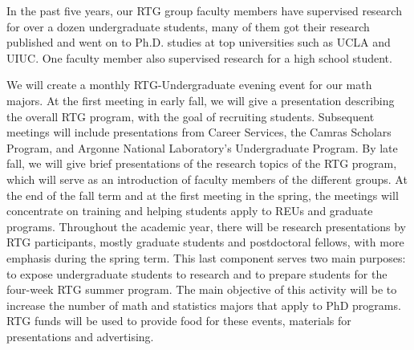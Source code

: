 \documentclass[11pt]{NSFamsart}
\begin{document}
In the past five years, our RTG group faculty members have
supervised research for over a dozen undergraduate students, many of them got their research published and went on to Ph.D. studies at top universities such as    UCLA and UIUC.   One faculty member also supervised research for a high school student.  




We will create a monthly RTG-Undergraduate evening event for our   math majors. At the first meeting in early fall,
we will give a presentation describing the overall RTG program, with the goal of recruiting students.
Subsequent meetings will include presentations from   Career  Services, the Camras Scholars
Program, and    Argonne National Laboratory's Undergraduate Program. By late fall, we will give brief presentations of the
research topics of the RTG program, which will serve as an introduction of faculty members of the different
groups. At the end of the fall term and at the first meeting in the spring, the meetings will concentrate on
training and helping students apply to REUs and graduate programs. Throughout the academic year, there
will be research presentations by RTG participants, mostly graduate students and postdoctoral fellows, with
more emphasis during the spring term. This last component serves two main purposes: to expose undergraduate
students to research and to prepare students for the four-week RTG summer program. The main
objective of this activity will be to increase the number of math and statistics majors that apply to PhD programs.
RTG funds will be used to provide food for these events, materials for presentations and advertising.

\iffalse
Our Interprofessional Projects (IPRO) Program provides the alternative to a traditional undergraduate education. Our signature IPRO Program remains one of just a few programs of its kind in the country. IPRO joins students from various majors to work together to solve real-world problems, often on behalf of sponsor companies and nonprofits. A required academic program, IPRO teaches leadership, creativity, teamwork, design thinking, and project management, uniquely preparing students to succeed in a professional work environment. Our department offers a recurring IPRO equivalent (an ``I Course'', taught as MATH 497) which has a special focus on techniques from mathematics and statistics.  Moreover, the  Pritzker Institute of Biomedical Science and Engineering provides a limited number of research stipends for undergraduate math majors to conduct research in biophysical modeling. 
\fi
\end{document}
